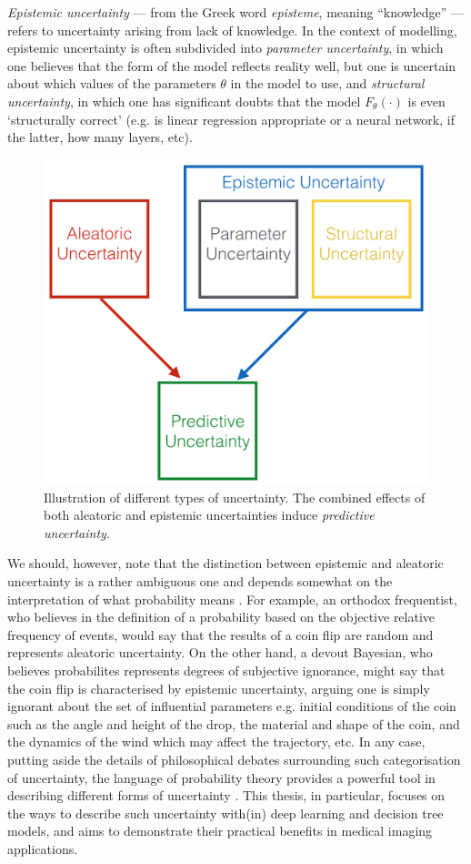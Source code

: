\textit{Epistemic uncertainty} — from the Greek word \textit{episteme}, meaning “knowledge” — refers to uncertainty arising from lack of knowledge. In the context of modelling, epistemic uncertainty is often subdivided into \textit{parameter uncertainty}, in which one believes that the form of the model reflects reality well, but one is uncertain about which values of the parameters $\theta$ in the model to use, and \textit{structural uncertainty}, in which one has significant doubts that the model $F_{\theta}(\cdot)$ is even ‘structurally correct’ (e.g. is linear regression appropriate or a neural network, if the latter, how many layers, etc).


\begin{figure}[ht]
	\vspace{-2mm}
	\includegraphics[width=0.4\linewidth]{chapter_1/uncertainty_taxonomy.png}
	\centering	
	\vspace{-2mm}
	\caption{\small Illustration of different types of uncertainty. The combined effects of both aleatoric and epistemic uncertainties induce \textit{predictive uncertainty}.  } 
	\label{fig:uncertainty_taxonomy}
\end{figure}

We should, however, note that the distinction between epistemic and aleatoric uncertainty is a rather ambiguous one and depends somewhat on the interpretation of what probability means \cite{cox2006principles,samaniego2010comparison}. For example, an orthodox frequentist, who believes in the definition of a probability based on the objective relative frequency of events, would say that the results of a coin flip are random and represents aleatoric uncertainty.  On the other hand, a devout Bayesian, who believes probabilites represents degrees of subjective ignorance, might say that the coin flip is characterised by epistemic uncertainty, arguing one is simply ignorant about the set of influential parameters e.g. initial conditions of the coin such as the angle and height of the drop, the material and shape of the coin, and the dynamics of the wind which may affect the trajectory, etc. In any case, putting aside the details of philosophical debates surrounding such categorisation of uncertainty, the language of probability theory provides a powerful tool in describing different forms of uncertainty \cite{sullivan2015introduction}. This thesis, in particular, focuses on the ways to describe such uncertainty with(in) deep learning and decision tree models, and aims to demonstrate their practical benefits in medical imaging applications. 

